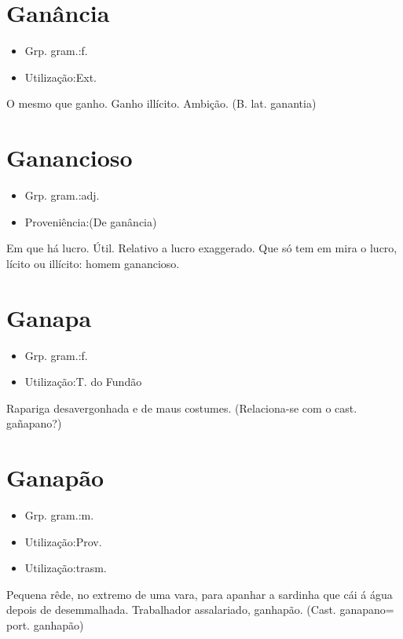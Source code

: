 \section{Ganância}
\begin{itemize}
\item {Grp. gram.:f.}
\end{itemize}
\begin{itemize}
\item {Utilização:Ext.}
\end{itemize}
O mesmo que \textunderscore ganho\textunderscore .
Ganho illícito.
Ambição.
(B. lat. \textunderscore ganantia\textunderscore )
\section{Ganancioso}
\begin{itemize}
\item {Grp. gram.:adj.}
\end{itemize}
\begin{itemize}
\item {Proveniência:(De \textunderscore ganância\textunderscore )}
\end{itemize}
Em que há lucro.
Útil.
Relativo a lucro exaggerado.
Que só tem em mira o lucro, lícito ou illícito: \textunderscore homem ganancioso\textunderscore .
\section{Ganapa}
\begin{itemize}
\item {Grp. gram.:f.}
\end{itemize}
\begin{itemize}
\item {Utilização:T. do Fundão}
\end{itemize}
Rapariga desavergonhada e de maus costumes.
(Relaciona-se com o cast. \textunderscore gañapano\textunderscore ?)
\section{Ganapão}
\begin{itemize}
\item {Grp. gram.:m.}
\end{itemize}
\begin{itemize}
\item {Utilização:Prov.}
\end{itemize}
\begin{itemize}
\item {Utilização:trasm.}
\end{itemize}
Pequena rêde, no extremo de uma vara, para apanhar a sardinha que cái á água depois de desemmalhada.
Trabalhador assalariado, ganhapão.
(Cast. \textunderscore ganapano\textunderscore  = port. \textunderscore ganhapão\textunderscore )
